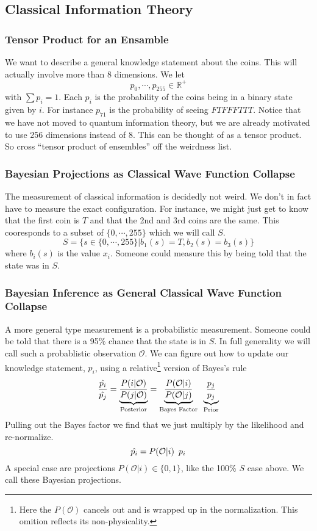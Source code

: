 \documentclass[12pt,a4paper]{article}
\begin{document}
\subsection{Classical Information Theory}
\subsubsection{Tensor Product for an Ensamble}
We want to describe a general knowledge statement about the coins.  This will actually involve more than 8 dimensions.  We let
\[
   p_0,\cdots,p_{255} \in \mathbb{R}^+
\]
with $\sum p_i = 1$.  Each $p_i$ is the probability of the coins being in a binary state given by $i$.  For instance $p_{71}$ is the probability of seeing $FTFFFTTT$. Notice that we have not moved to quantum information theory, but we are already motivated to use 256 dimensions instead of 8.  This can be thought of as a tensor product.  So cross ``tensor product of ensembles'' off the weirdness list.

\subsubsection{Bayesian Projections as Classical Wave Function Collapse}
The measurement of classical information is decidedly not weird.  We don't in fact have to measure the exact configuration.  For instance, we might just get to know that the first coin is $T$ and that the 2nd and 3rd coins are the same.  This cooresponds to a subset of $\{0,\cdots,255\}$ which we will call $S$.
\[
   S = \{s \in \{0,\cdots,255\} | b_1(s) = T, b_2(s) = b_3(s) \}
\]
where $b_i(s)$ is the value $x_i$.  Someone could measure this by being told that the state was in $S$.

\subsubsection{Bayesian Inference as General Classical Wave Function Collapse}
A more general type measurement is a probabilistic measurement.  Someone could be told that there is a 95\% chance that the state is in $S$.  In full generality we will call such a probablistic observation $\mathcal{O}$.  We can figure out how to update our knowledge statement, $p_i$, using a relative\footnote{Here the $P(\mathcal{O})$ cancels out and is wrapped up in the normalization. This omition reflects its non-physicality.} version of Bayes's rule
\[
  \frac{\hat{p_i}}{\hat{p_j}} = \underbrace{\frac{P(i | \mathcal{O})}{P(j | \mathcal{O})}}_\text{Posterior}
                              = \underbrace{\frac{P(\mathcal{O} | i)}{P(\mathcal{O}|j)}}_\text{Bayes Factor}  \hspace{0.07 in}  \underbrace{\frac{p_j}{p_j}}_\text{Prior}
\]
Pulling out the Bayes factor we find that we just multiply by the likelihood and re-normalize.
\[
  \hat{p_i} =  P(\mathcal{O} | i) \hspace{0.07 in} p_i
\]
A special case are projections $P(\mathcal{O} | i) \in \{0,1\}$, like the 100\% $S$ case above.  We call these Bayesian projections.
\end{document}
